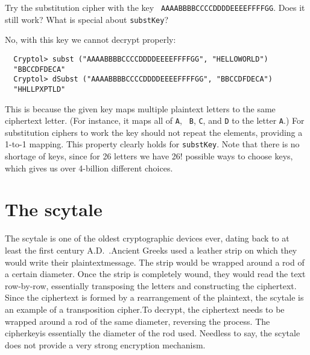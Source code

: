 
\begin{Exercise}\label{ex:subst:3}
  Try the substitution cipher with the key {\tt
    AAAABBBBCCCCDDDDEEEEFFFFGG}. Does it still work?  What is special
  about {\tt substKey}?
\end{Exercise}
\begin{Answer}
No, with this key we cannot decrypt properly:
\begin{Verbatim}
  Cryptol> subst ("AAAABBBBCCCCDDDDEEEEFFFFGG", "HELLOWORLD")
  "BBCCDFDECA"
  Cryptol> dSubst ("AAAABBBBCCCCDDDDEEEEFFFFGG", "BBCCDFDECA")
  "HHLLPXPTLD"
\end{Verbatim}
This is because the given key maps multiple plaintext letters to the
same ciphertext letter. (For instance, it maps all of {\tt A}, {\tt
  B}, {\tt C}, and {\tt D} to the letter {\tt A}.) For substitution
ciphers to work the key should not repeat the elements, providing a
1-to-1 mapping. This property clearly holds for {\tt substKey}. Note
that there is no shortage of keys, since for 26 letters we have 26!
possible ways to choose keys, which gives us over 4-billion different
choices.
\end{Answer}

\section{The scytale}
\label{sec:scytale}

The scytale is one of the oldest cryptographic devices ever, dating
back to at least the first century
A.D.~\cite{wiki:scytale}.\indScytale Ancient Greeks used a leather
strip on which they would write their plaintext\indPlaintext message.
The strip would be wrapped around a rod of a certain diameter. Once
the strip is completely wound, they would read the text row-by-row,
essentially transposing the letters and constructing the
ciphertext\indCiphertext. Since the ciphertext is formed by a
rearrangement of the plaintext, the scytale is an example of a
transposition cipher.\indTranspositioncipher To decrypt, the
ciphertext needs to be wrapped around a rod of the same diameter,
reversing the process. The cipherkey\indCipherkey is essentially the
diameter of the rod used. Needless to say, the scytale does not
provide a very strong encryption mechanism.

